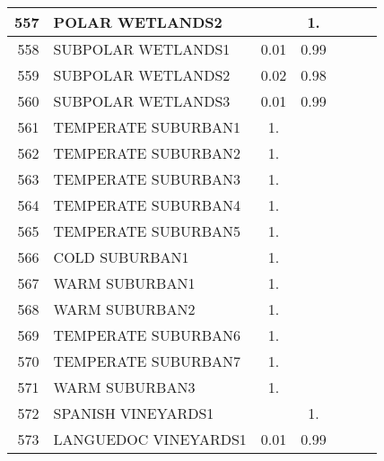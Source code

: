 {{\begin{tabular}{||r|l||c|c|c|c|c||}
 \hline
         557  & POLAR WETLANDS2                                              &       &  1.   &       &       \\
 \hline
         558  & SUBPOLAR WETLANDS1                                           &  0.01 &  0.99 &       &       \\
 \hline
         559  & SUBPOLAR WETLANDS2                                           &  0.02 &  0.98 &       &       \\
 \hline
         560  & SUBPOLAR WETLANDS3                                           &  0.01 &  0.99 &       &       \\
 \hline
         561  & TEMPERATE SUBURBAN1                                          &  1.   &       &       &       \\
 \hline
         562  & TEMPERATE SUBURBAN2                                          &  1.   &       &       &       \\
 \hline
         563  & TEMPERATE SUBURBAN3                                          &  1.   &       &       &       \\
 \hline
         564  & TEMPERATE SUBURBAN4                                          &  1.   &       &       &       \\
 \hline
         565  & TEMPERATE SUBURBAN5                                          &  1.   &       &       &       \\
 \hline
         566  & COLD SUBURBAN1                                               &  1.   &       &       &       \\
 \hline
         567  & WARM SUBURBAN1                                               &  1.   &       &       &       \\
 \hline
         568  & WARM SUBURBAN2                                               &  1.   &       &       &       \\
 \hline
         569  & TEMPERATE SUBURBAN6                                          &  1.   &       &       &       \\
 \hline
         570  & TEMPERATE SUBURBAN7                                          &  1.   &       &       &       \\
 \hline
         571  & WARM SUBURBAN3                                               &  1.   &       &       &       \\
 \hline
         572  & SPANISH VINEYARDS1                                           &       &  1.   &       &       \\
 \hline
         573  & LANGUEDOC VINEYARDS1                                         &  0.01 &  0.99 &       &       \\
 \hline
 \end{tabular}
 \clearpage
 }}
 
